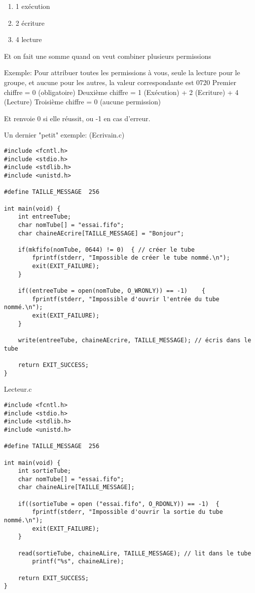 \documentclass[a4paper]{article}
\begin{document}
\begin{description}
\begin{enumerate}
\begin{enumerate}
      \begin{enumerate}
        \item 1 exécution
        \item 2 écriture
        \item 4 lecture\newline
      \end{enumerate}
      Et on fait une somme quand on veut combiner plusieurs permissions\par
      Exemple:\newline
      Pour attribuer toutes les permissions à vous, seule la lecture pour le groupe, et aucune pour les autres, la valeur correspondante est 0720\newline
      Premier chiffre = 0 (obligatoire)\newline
      Deuxième chiffre = 1 (Exécution) + 2 (Ecriture) + 4 (Lecture)\newline
      Troisième chiffre = 0 (aucune permission)\newline
    \end{enumerate}
  \end{enumerate}
  \item Et renvoie 0 si elle réussit, ou -1 en cas d'erreur.
\end{description}
\newpage
Un dernier "petit" exemple:  (Ecrivain.c)
\begin{lstlisting}
#include <fcntl.h>
#include <stdio.h>
#include <stdlib.h>
#include <unistd.h>

#define TAILLE_MESSAGE	256

int main(void) {
	int entreeTube;
	char nomTube[] = "essai.fifo";
	char chaineAEcrire[TAILLE_MESSAGE] = "Bonjour";

	if(mkfifo(nomTube, 0644) != 0) 	{ // créer le tube
		fprintf(stderr, "Impossible de créer le tube nommé.\n");
		exit(EXIT_FAILURE);
	}

	if((entreeTube = open(nomTube, O_WRONLY)) == -1) 	{
		fprintf(stderr, "Impossible d'ouvrir l'entrée du tube nommé.\n");
		exit(EXIT_FAILURE);
	}

	write(entreeTube, chaineAEcrire, TAILLE_MESSAGE); // écris dans le tube

	return EXIT_SUCCESS;
}
\end{lstlisting}
Lecteur.c
\begin{lstlisting}
#include <fcntl.h>
#include <stdio.h>
#include <stdlib.h>
#include <unistd.h>

#define TAILLE_MESSAGE	256

int main(void) {
	int sortieTube;
	char nomTube[] = "essai.fifo";
	char chaineALire[TAILLE_MESSAGE];

	if((sortieTube = open ("essai.fifo", O_RDONLY)) == -1) 	{
		fprintf(stderr, "Impossible d'ouvrir la sortie du tube nommé.\n");
		exit(EXIT_FAILURE);
	}

	read(sortieTube, chaineALire, TAILLE_MESSAGE); // lit dans le tube
        printf("%s", chaineALire);

	return EXIT_SUCCESS;
}

\end{lstlisting}
\end{document}
